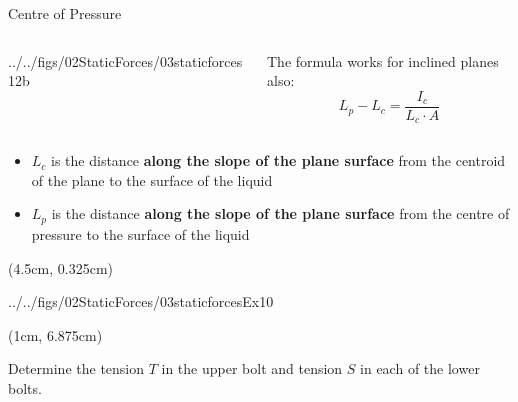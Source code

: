 \documentclass[9pt,xcolor={svgnames, x11names},professionalfonts, mathserif]{beamer}
\begin{document}

\begin{frame}{Centre of Pressure}
	\begin{columns}
		\begin{column}{0.45\textwidth}
			\par\vspace{-1cm}
			\begin{cfig}[0.6]{../../figs/02StaticForces/03staticforces12b}\end{cfig}
		\end{column}
		\begin{column}{0.4\textwidth}
			\par\vspace{3cm}
			The formula works for inclined planes also:
			\[ L_p -L_c=\frac{I_c}{L_c\cdot A} \]
		\end{column}
	\end{columns}
	\begin{itemize}
		\item $L_c$ is the distance \textbf{along the slope of the plane surface} from the centroid of the plane to the surface of the liquid
		\item $L_p$ is the distance \textbf{along the slope of the plane surface} from the centre of pressure to the surface of the liquid
	\end{itemize}
\end{frame}


\begin{frame}
	\begin{textblock*}{8cm} (4.5cm, 0.325cm)
		\begin{mybox}[colframe=example, colbacktitle=example!80!white]
			\vspace{-0.25cm}
			\begin{cfig}[0.65]{../../figs/02StaticForces/03staticforcesEx10}\end{cfig}
			\vspace{-0.5cm}
		\end{mybox}
	\end{textblock*}
	\begin{textblock*}{5.5cm} (1cm, 6.875cm)
		\begin{myexam}[colframe=example, colbacktitle=example!80!white]{}{}
			\raggedright
			Determine the tension $T$ in the upper bolt and tension $S$ in each of the lower bolts.
		\end{myexam}
	\end{textblock*}
\end{frame}
\end{document}
